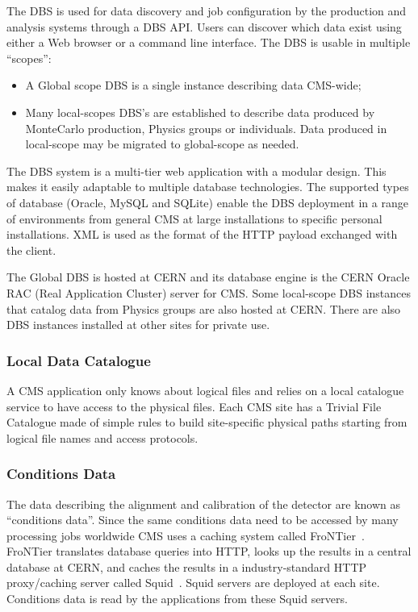 The DBS is used for data discovery and job configuration by the production and analysis systems through a DBS API. 
Users can discover %
which data exist using either a Web browser or a command line interface.
The DBS is usable in multiple ``scopes'':
\begin{itemize}
\item A Global scope DBS is a single instance describing data CMS-wide; 
\item Many local-scopes DBS's are established to describe data produced by MonteCarlo production, Physics groups or individuals. 
Data produced in local-scope may be migrated to global-scope as needed.

\end{itemize}
The DBS system is a multi-tier web application with a modular design. This makes it easily adaptable to multiple database technologies. The supported types of database (Oracle, MySQL and SQLite) enable the DBS deployment in a range of environments from general CMS at large installations to specific personal installations.
XML is used as the format of the HTTP payload exchanged with the client.

The Global DBS is hosted at CERN and its database engine is the CERN Oracle RAC (Real Application Cluster) server for CMS. Some local-scope DBS instances that catalog data from Physics groups are also hosted at CERN. There are also DBS instances installed at other sites for private use. 

\subsubsection{Local Data Catalogue}
\label{sec:3_1_2}
A CMS application only knows about logical files and relies on a local catalogue service to have access to the physical files. %
Each CMS site has a Trivial File Catalogue made of simple rules to build site-specific physical paths starting from logical file names and access protocols.

\subsubsection{Conditions Data}
\label{sec:3_1_3}
The data describing the alignment and calibration of the detector are known as ``conditions data''. Since the same conditions data need to be accessed by many processing jobs worldwide CMS uses a caching system called FroNTier~\cite{RefFrontier}.
FroNTier translates database queries into HTTP, looks up the results in a central database at CERN, and caches the results in a industry-standard HTTP proxy/caching server called Squid~\cite{RefFrontier}. Squid servers are deployed at each site. Conditions data is read by the applications from these Squid servers.


